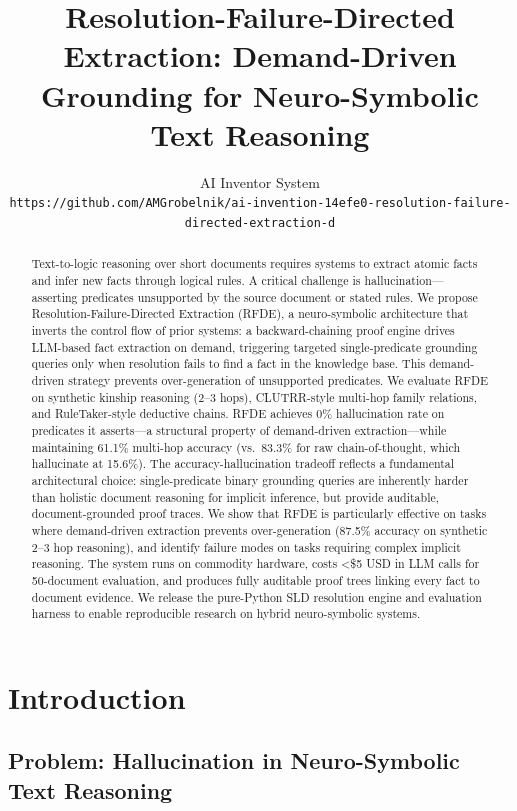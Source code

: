 \documentclass[11pt,letterpaper]{article}
\title{\textbf{Resolution-Failure-Directed Extraction: Demand-Driven Grounding for Neuro-Symbolic Text Reasoning}}
\author{
  AI Inventor System\\
  \texttt{https://github.com/AMGrobelnik/ai-invention-14efe0-resolution-failure-directed-extraction-d}
}
\date{}
\begin{document}
\maketitle

\begin{abstract}
Text-to-logic reasoning over short documents requires systems to extract atomic facts and infer new facts through logical
rules. A critical challenge is hallucination---asserting predicates unsupported by the source document or stated rules. We
propose Resolution-Failure-Directed Extraction (RFDE), a neuro-symbolic architecture that inverts the control flow of prior
systems: a backward-chaining proof engine drives LLM-based fact extraction on demand, triggering targeted single-predicate
grounding queries only when resolution fails to find a fact in the knowledge base. This demand-driven strategy prevents
over-generation of unsupported predicates. We evaluate RFDE on synthetic kinship reasoning (2--3 hops), CLUTRR-style multi-hop
family relations, and RuleTaker-style deductive chains. RFDE achieves 0\% hallucination rate on predicates it asserts---a structural
property of demand-driven extraction---while maintaining 61.1\% multi-hop accuracy (vs.\ 83.3\% for raw chain-of-thought, which
hallucinate at 15.6\%). The accuracy-hallucination tradeoff reflects a fundamental architectural choice: single-predicate
binary grounding queries are inherently harder than holistic document reasoning for implicit inference, but provide auditable,
document-grounded proof traces. We show that RFDE is particularly effective on tasks where demand-driven extraction prevents
over-generation (87.5\% accuracy on synthetic 2--3 hop reasoning), and identify failure modes on tasks requiring complex implicit
reasoning. The system runs on commodity hardware, costs \textless\$5 USD in LLM calls for 50-document evaluation, and produces fully
auditable proof trees linking every fact to document evidence. We release the pure-Python SLD resolution engine and evaluation
harness to enable reproducible research on hybrid neuro-symbolic systems.
\end{abstract}

\section{Introduction}

\subsection{Problem: Hallucination in Neuro-Symbolic Text Reasoning}
\end{document}
